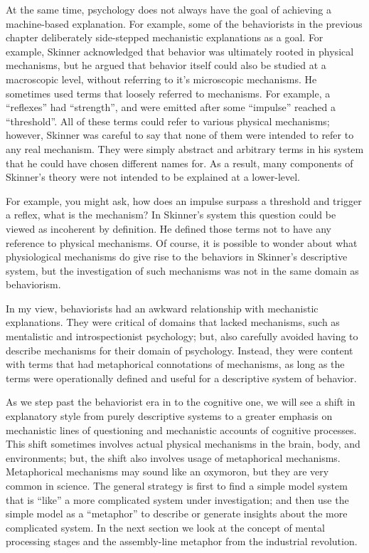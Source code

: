 \documentclass[
  oneside,
  12pt]{crumpbook}
\begin{document}
At the same time, psychology does not always have the goal of achieving a machine-based explanation. For example, some of the behaviorists in the previous chapter deliberately side-stepped mechanistic explanations as a goal. For example, Skinner acknowledged that behavior was ultimately rooted in physical mechanisms, but he argued that behavior itself could also be studied at a macroscopic level, without referring to it's microscopic mechanisms. He sometimes used terms that loosely referred to mechanisms. For example, a ``reflexes'' had ``strength'', and were emitted after some ``impulse'' reached a ``threshold''. All of these terms could refer to various physical mechanisms; however, Skinner was careful to say that none of them were intended to refer to any real mechanism. They were simply abstract and arbitrary terms in his system that he could have chosen different names for. As a result, many components of Skinner's theory were not intended to be explained at a lower-level.

For example, you might ask, how does an impulse surpass a threshold and trigger a reflex, what is the mechanism? In Skinner's system this question could be viewed as incoherent by definition. He defined those terms not to have any reference to physical mechanisms. Of course, it is possible to wonder about what physiological mechanisms do give rise to the behaviors in Skinner's descriptive system, but the investigation of such mechanisms was not in the same domain as behaviorism.

In my view, behaviorists had an awkward relationship with mechanistic explanations. They were critical of domains that lacked mechanisms, such as mentalistic and introspectionist psychology; but, also carefully avoided having to describe mechanisms for their domain of psychology. Instead, they were content with terms that had metaphorical connotations of mechanisms, as long as the terms were operationally defined and useful for a descriptive system of behavior.

As we step past the behaviorist era in to the cognitive one, we will see a shift in explanatory style from purely descriptive systems to a greater emphasis on mechanistic lines of questioning and mechanistic accounts of cognitive processes. This shift sometimes involves actual physical mechanisms in the brain, body, and environments; but, the shift also involves usage of metaphorical mechanisms. Metaphorical mechanisms may sound like an oxymoron, but they are very common in science. The general strategy is first to find a simple model system that is ``like'' a more complicated system under investigation; and then use the simple model as a ``metaphor'' to describe or generate insights about the more complicated system. In the next section we look at the concept of mental processing stages and the assembly-line metaphor from the industrial revolution.
\end{document}

